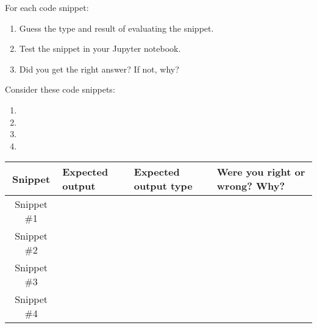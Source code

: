\documentclass[11pt]{article}
\begin{document}
For each code snippet:
\begin{enumerate}
  \item
    Guess the type and result of evaluating the snippet.
  \item
    Test the snippet in your Jupyter notebook.
  \item
    Did you get the right answer? If not, why?
\end{enumerate}
%
Consider these code snippets:
\begin{enumerate}
  \item
    

  \item
    

  \item
    

  \item
    
\end{enumerate}

\renewcommand{\arraystretch}{3.5}
\begin{tabular}{| c | p{5em}| p{5em} | p{21em} |}
    \hline %
    \textbf{Snippet} & \textbf{Expected output}
    & \textbf{Expected output type} & \textbf{Were you right or wrong? Why?} \\ \hline
    Snippet \#1 & ~ & ~ & ~ \\ \hline
    Snippet \#2 & ~ & ~ & ~ \\ \hline
    Snippet \#3 & ~ & ~ & ~ \\ \hline
    Snippet \#4 & ~ & ~ & ~ \\ \hline
\end{tabular}
\end{document}
